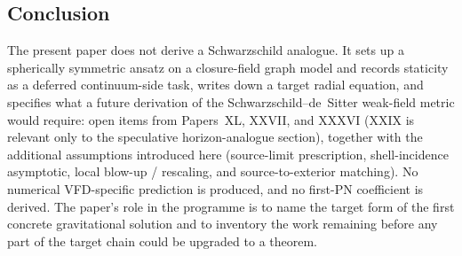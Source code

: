 \documentclass[12pt]{article}
\theoremstyle{definition}
\theoremstyle{remark}
\begin{document}
\subsection{Conclusion}

The present paper does not derive a Schwarzschild analogue. It sets up a spherically symmetric ansatz on a closure-field graph model and records staticity as a deferred continuum-side task, writes down a target radial equation, and specifies what a future derivation of the Schwarzschild--de~Sitter weak-field metric would require: open items from Papers~XL, XXVII, and XXXVI (XXIX is relevant only to the speculative horizon-analogue section), together with the additional assumptions introduced here (source-limit prescription, shell-incidence asymptotic, local blow-up / rescaling, and source-to-exterior matching). No numerical VFD-specific prediction is produced, and no first-PN coefficient is derived. The paper's role in the programme is to name the target form of the first concrete gravitational solution and to inventory the work remaining before any part of the target chain could be upgraded to a theorem.
\end{document}
